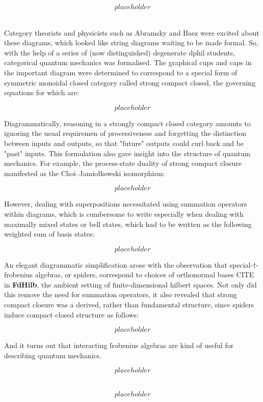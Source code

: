 \begin{fullwidth}
\[placeholder\]

\\

Category theorists and physicists such as Abramsky and Baez were excited about these diagrams, which looked like string diagrams waiting to be made formal. So, with the help of a series of (now distinguished) degenerate dphil students, categorical quantum mechanics was formalised. The graphical cups and caps in the important diagram were determined to correspond to a special form of symmetric monoidal closed category called strong compact closed, the governing equations for which are:

\[placeholder\]

Diagrammatically, reasoning in a strongly compact closed category amounts to ignoring the usual requiremen of processiveness and forgetting the distinction between inputs and outputs, so that "future" outputs could curl back and be "past" inputs. This formulation also gave insight into the structure of quantum mechanics. For example, the process-state duality of strong compact closure manifested as the Choi–Jamiołkowski isomorphism:

\[placeholder\]

However, dealing with superpositions necessitated using summation operators within diagrams, which is cumbersome to write especially when dealing with maximally mixed states or bell states, which had to be written as the following weighted sum of basis states:

\[placeholder\]

An elegant diagrammatic simplification arose with the observation that special-$\dagger$-frobenius algebras, or spiders, correspond to choices of orthonormal bases \bR CITE \e in \textbf{FdHilb}, the ambient setting of finite-dimensional hilbert spaces. Not only did this remove the need for summation operators, it also revealed that strong compact closure was a derived, rather than fundamental structure, since spiders induce compact closed structure as follows:

\[placeholder\]

And it turns out that interacting frobenius algebras are kind of useful for describing quantum mechanics.

\[placeholder\]

\\

\[placeholder\]


\end{fullwidth}
